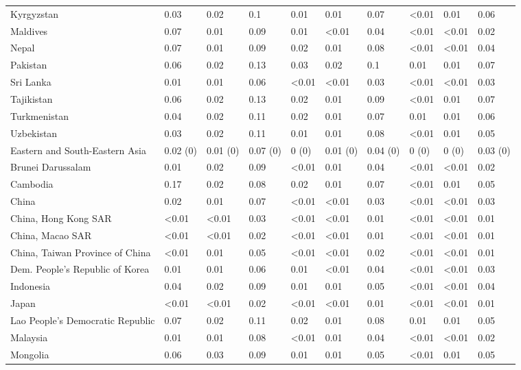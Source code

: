 \begin{longtable}[t]{llllllllll}
\addlinespace
Kyrgyzstan & 0.03 & 0.02 & 0.1 & 0.01 & 0.01 & 0.07 & <0.01 & 0.01 & 0.06\\
Maldives & 0.07 & 0.01 & 0.09 & 0.01 & <0.01 & 0.04 & <0.01 & <0.01 & 0.02\\
Nepal & 0.07 & 0.01 & 0.09 & 0.02 & 0.01 & 0.08 & <0.01 & <0.01 & 0.04\\
Pakistan & 0.06 & 0.02 & 0.13 & 0.03 & 0.02 & 0.1 & 0.01 & 0.01 & 0.07\\
Sri Lanka & 0.01 & 0.01 & 0.06 & <0.01 & <0.01 & 0.03 & <0.01 & <0.01 & 0.03\\
\addlinespace
Tajikistan & 0.06 & 0.02 & 0.13 & 0.02 & 0.01 & 0.09 & <0.01 & 0.01 & 0.07\\
Turkmenistan & 0.04 & 0.02 & 0.11 & 0.02 & 0.01 & 0.07 & 0.01 & 0.01 & 0.06\\
Uzbekistan & 0.03 & 0.02 & 0.11 & 0.01 & 0.01 & 0.08 & <0.01 & 0.01 & 0.05\\
Eastern and South-Eastern Asia & 0.02 (0) & 0.01 (0) & 0.07 (0) & 0 (0) & 0.01 (0) & 0.04 (0) & 0 (0) & 0 (0) & 0.03 (0)\\
Brunei Darussalam & 0.01 & 0.02 & 0.09 & <0.01 & 0.01 & 0.04 & <0.01 & <0.01 & 0.02\\
\addlinespace
Cambodia & 0.17 & 0.02 & 0.08 & 0.02 & 0.01 & 0.07 & <0.01 & 0.01 & 0.05\\
China & 0.02 & 0.01 & 0.07 & <0.01 & <0.01 & 0.03 & <0.01 & <0.01 & 0.03\\
China, Hong Kong SAR & <0.01 & <0.01 & 0.03 & <0.01 & <0.01 & 0.01 & <0.01 & <0.01 & 0.01\\
China, Macao SAR & <0.01 & <0.01 & 0.02 & <0.01 & <0.01 & 0.01 & <0.01 & <0.01 & 0.01\\
China, Taiwan Province of China & <0.01 & 0.01 & 0.05 & <0.01 & <0.01 & 0.02 & <0.01 & <0.01 & 0.01\\
\addlinespace
Dem. People's Republic of Korea & 0.01 & 0.01 & 0.06 & 0.01 & <0.01 & 0.04 & <0.01 & <0.01 & 0.03\\
Indonesia & 0.04 & 0.02 & 0.09 & 0.01 & 0.01 & 0.05 & <0.01 & <0.01 & 0.04\\
Japan & <0.01 & <0.01 & 0.02 & <0.01 & <0.01 & 0.01 & <0.01 & <0.01 & 0.01\\
Lao People's Democratic Republic & 0.07 & 0.02 & 0.11 & 0.02 & 0.01 & 0.08 & 0.01 & 0.01 & 0.05\\
Malaysia & 0.01 & 0.01 & 0.08 & <0.01 & 0.01 & 0.04 & <0.01 & <0.01 & 0.02\\
\addlinespace
Mongolia & 0.06 & 0.03 & 0.09 & 0.01 & 0.01 & 0.05 & <0.01 & 0.01 & 0.05\\

\end{longtable}
